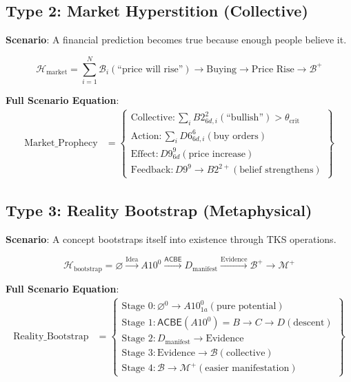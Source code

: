 \documentclass[11pt,twoside]{book}
\newcommand{\ACBE}{\mathsf{ACBE}}
\newcommand{\Hyperstition}{\mathcal{H}}
\begin{document}
\subsection{Type 2: Market Hyperstition (Collective)}

\textbf{Scenario}: A financial prediction becomes true because enough people believe it.

\begin{equation}
\boxed{
    \Hyperstition_{\mathrm{market}} = \sum_{i=1}^{N} \mathcal{B}_i(\text{``price will rise''})
    \to \text{Buying} \to \text{Price Rise} \to \mathcal{B}^+
}
\end{equation}

\textbf{Full Scenario Equation}:
\begin{align}
    \text{Market\_Prophecy} &= \left\{
    \begin{array}{l}
        \text{Collective}: \sum_i B2^2_{6d,i}(\text{``bullish''}) > \theta_{\mathrm{crit}} \\
        \text{Action}: \sum_i D6^6_{6d,i}(\text{buy orders}) \\
        \text{Effect}: D9^9_{6d}(\text{price increase}) \\
        \text{Feedback}: D9^9 \to B2^{2+}(\text{belief strengthens})
    \end{array}
    \right\}
\end{align}

\subsection{Type 3: Reality Bootstrap (Metaphysical)}

\textbf{Scenario}: A concept bootstraps itself into existence through TKS operations.

\begin{equation}
\boxed{
    \Hyperstition_{\mathrm{bootstrap}} = \varnothing \xrightarrow{\text{Idea}} A10^0
    \xrightarrow{\ACBE} D_{\mathrm{manifest}}
    \xrightarrow{\text{Evidence}} \mathcal{B}^+ \to \mathcal{M}^+
}
\end{equation}

\textbf{Full Scenario Equation}:
\begin{align}
    \text{Reality\_Bootstrap} &= \left\{
    \begin{array}{l}
        \text{Stage 0}: \varnothing^0 \to A10^0_{1a}(\text{pure potential}) \\
        \text{Stage 1}: \ACBE(A10^0) = B \to C \to D(\text{descent}) \\
        \text{Stage 2}: D_{\mathrm{manifest}} \to \mathrm{Evidence} \\
        \text{Stage 3}: \mathrm{Evidence} \to \mathcal{B}(\mathrm{collective}) \\
        \text{Stage 4}: \mathcal{B} \to \mathcal{M}^+(\text{easier manifestation})
    \end{array}
    \right\}
\end{align}
\end{document}
